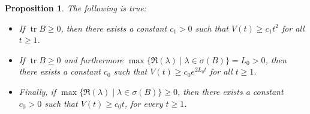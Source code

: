 \documentclass[11pt,letter]{amsart}
\numberwithin{equation}{section}
\newcommand{\tr}{\operatorname{tr}}
\newtheorem{proposition}[theorem]{Proposition}
\numberwithin{equation}{section}
\begin{document}
\begin{proposition}\label{P:boom0}
The following is true:
\begin{itemize}
\item[(i)] If $\tr B \ge 0$, then there exists a constant $c_1>0$ such that $V(t) \geq c_1 t^2$ for all $t\geq 1$.
\item[(ii)] If $\tr B \ge 0$ and furthermore $\max\{\Re(\lambda)\mid \lambda\in \sigma(B)\}=L_0>0$, then there exists a constant $c_0$ such that $V(t)\geq c_0 e^{2 L_0 t}$ for all $t\geq 1$.
\item[(iii)] Finally, if $\max\{\Re(\lambda)\mid \lambda\in \sigma(B)\}\geq 0$, then there exists a constant $c_0>0$ such that $V(t)\geq c_0 t$, for every $t\ge 1$.
\end{itemize}
\end{proposition}



 











\end{document}
